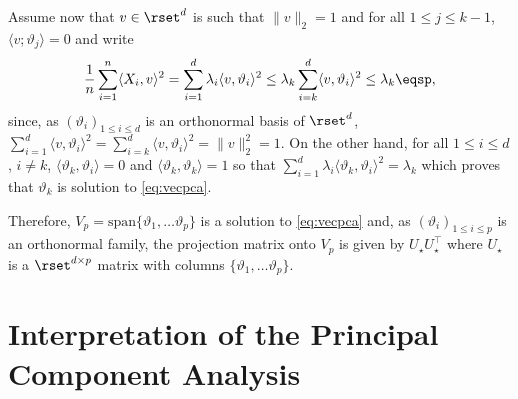Assume now that  $v\in \rset^d$ is such that $\|v\|_2=1$ and for all $1\leqslant j \leqslant k-1$,  $\langle v ; \vartheta_j\rangle = 0$ and write
$$
\frac{1}{n}\sum_{i=1}^n\langle X_i,v\rangle^2 = \sum_{i=1}^d \lambda_i \langle v,\vartheta_i\rangle^2\le \lambda_k  \sum_{i=k}^d \langle v,\vartheta_i\rangle^2 \le \lambda_k\eqsp,
$$
since, as $(\vartheta_i)_{1\leqslant i \leqslant d}$ is an orthonormal basis of $\rset^d$,  $\sum_{i=1}^d \langle v,\vartheta_i\rangle^2 = \sum_{i=k}^d \langle v,\vartheta_i\rangle^2 = \|v\|_2^2 = 1$. On the other hand, for all $1\leqslant i \leqslant d$, $i\neq k$, $\langle \vartheta_k,\vartheta_i\rangle =0$ and $\langle \vartheta_k,\vartheta_k\rangle=1$ so that $\sum_{i=1}^d \lambda_i \langle \vartheta_k,\vartheta_i\rangle^2 = \lambda_k$ which proves that $\vartheta_k$ is solution to \eqref{eq:vecpca}. 

Therefore, $V_p = \mathrm{span}\{\vartheta_1,\ldots\vartheta_p\}$ is a solution to \eqref{eq:vecpca} and, as $(\vartheta_i)_{1\leqslant i \leqslant p}$ is an orthonormal family, the projection matrix onto $V_p$ is given by $U_{\star}U^\top_{\star}$ where $U_{\star}$ is a $\rset^{d\times p}$ matrix with columns $\{\vartheta_1,\ldots\vartheta_p\}$.

\section{Interpretation of the Principal Component Analysis}
